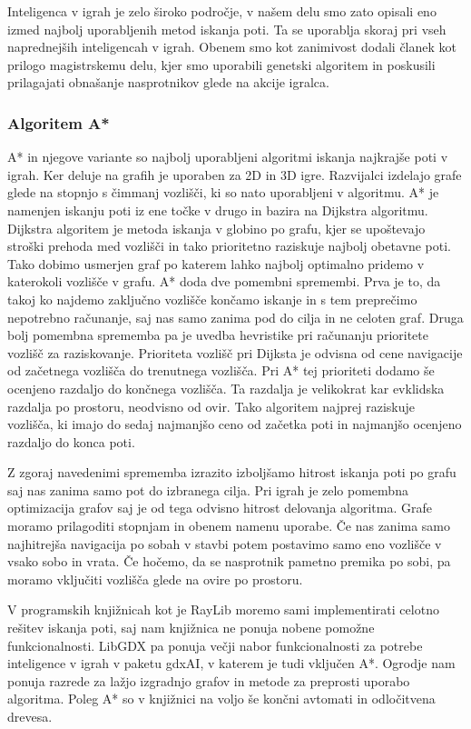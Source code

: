 \documentclass[12pt,a4paper,twoside]{book}
\begin{document}
Inteligenca v igrah je zelo široko področje, v našem delu smo zato opisali eno izmed najbolj uporabljenih metod iskanja poti. Ta se uporablja skoraj pri vseh naprednejših inteligencah v igrah. Obenem smo kot zanimivost dodali članek kot prilogo magistrskemu delu, kjer smo uporabili genetski algoritem in poskusili prilagajati obnašanje nasprotnikov glede na akcije igralca.

\subsubsection{Algoritem A*}

A* in njegove variante so najbolj uporabljeni algoritmi iskanja najkrajše poti v igrah. Ker deluje na grafih je uporaben za 2D in 3D igre. Razvijalci izdelajo grafe glede na stopnjo s čimmanj vozlišči, ki so nato uporabljeni v algoritmu. A* je namenjen iskanju poti iz ene točke v drugo in bazira na Dijkstra algoritmu. Dijkstra algoritem je metoda iskanja v globino po grafu, kjer se upoštevajo stroški prehoda med vozlišči in tako prioritetno raziskuje najbolj obetavne poti. Tako dobimo usmerjen graf po katerem lahko najbolj optimalno pridemo v katerokoli vozlišče v grafu. A* doda dve pomembni spremembi. Prva je to, da takoj ko najdemo zaključno vozlišče končamo iskanje in s tem preprečimo nepotrebno računanje, saj nas samo zanima pod do cilja in ne celoten graf. Druga bolj pomembna sprememba pa je uvedba hevristike pri računanju prioritete vozlišč za raziskovanje. Prioriteta vozlišč pri Dijksta je odvisna od cene navigacije od začetnega vozlišča do trenutnega vozlišča. Pri A* tej prioriteti dodamo še ocenjeno razdaljo do končnega vozlišča. Ta razdalja je velikokrat kar evklidska razdalja po prostoru, neodvisno od ovir. Tako algoritem najprej raziskuje vozlišča, ki imajo do sedaj najmanjšo ceno od začetka poti in najmanjšo ocenjeno razdaljo do konca poti. 

Z zgoraj navedenimi sprememba izrazito izboljšamo hitrost iskanja poti po grafu saj nas zanima samo pot do izbranega cilja. Pri igrah je zelo pomembna optimizacija grafov saj je od tega odvisno hitrost delovanja algoritma. Grafe moramo prilagoditi stopnjam in obenem namenu uporabe. Če nas zanima samo najhitrejša navigacija po sobah v stavbi potem postavimo samo eno vozlišče v vsako sobo in vrata. Če hočemo, da se nasprotnik pametno premika po sobi, pa moramo vključiti vozlišča glede na ovire po prostoru.

V programskih knjižnicah kot je RayLib moremo sami implementirati celotno rešitev iskanja poti, saj nam knjižnica ne ponuja nobene pomožne funkcionalnosti. LibGDX pa ponuja večji nabor funkcionalnosti za potrebe inteligence v igrah v paketu gdxAI, v katerem je tudi vključen A*. Ogrodje nam ponuja razrede za lažjo izgradnjo grafov in metode za preprosti uporabo algoritma. Poleg A* so v knjižnici na voljo še končni avtomati in odločitvena drevesa.
\end{document}
